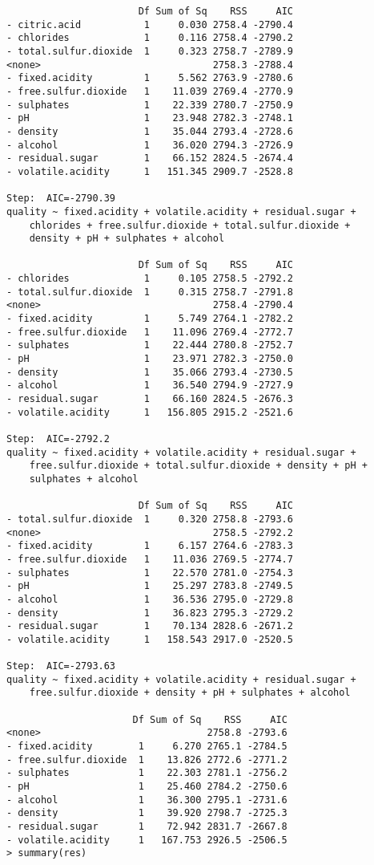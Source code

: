 \documentclass{jsarticle}
\begin{document}
\begin{verbatim}
                       Df Sum of Sq    RSS     AIC
- citric.acid           1     0.030 2758.4 -2790.4
- chlorides             1     0.116 2758.4 -2790.2
- total.sulfur.dioxide  1     0.323 2758.7 -2789.9
<none>                              2758.3 -2788.4
- fixed.acidity         1     5.562 2763.9 -2780.6
- free.sulfur.dioxide   1    11.039 2769.4 -2770.9
- sulphates             1    22.339 2780.7 -2750.9
- pH                    1    23.948 2782.3 -2748.1
- density               1    35.044 2793.4 -2728.6
- alcohol               1    36.020 2794.3 -2726.9
- residual.sugar        1    66.152 2824.5 -2674.4
- volatile.acidity      1   151.345 2909.7 -2528.8

Step:  AIC=-2790.39
quality ~ fixed.acidity + volatile.acidity + residual.sugar + 
    chlorides + free.sulfur.dioxide + total.sulfur.dioxide + 
    density + pH + sulphates + alcohol

                       Df Sum of Sq    RSS     AIC
- chlorides             1     0.105 2758.5 -2792.2
- total.sulfur.dioxide  1     0.315 2758.7 -2791.8
<none>                              2758.4 -2790.4
- fixed.acidity         1     5.749 2764.1 -2782.2
- free.sulfur.dioxide   1    11.096 2769.4 -2772.7
- sulphates             1    22.444 2780.8 -2752.7
- pH                    1    23.971 2782.3 -2750.0
- density               1    35.066 2793.4 -2730.5
- alcohol               1    36.540 2794.9 -2727.9
- residual.sugar        1    66.160 2824.5 -2676.3
- volatile.acidity      1   156.805 2915.2 -2521.6

Step:  AIC=-2792.2
quality ~ fixed.acidity + volatile.acidity + residual.sugar + 
    free.sulfur.dioxide + total.sulfur.dioxide + density + pH + 
    sulphates + alcohol

                       Df Sum of Sq    RSS     AIC
- total.sulfur.dioxide  1     0.320 2758.8 -2793.6
<none>                              2758.5 -2792.2
- fixed.acidity         1     6.157 2764.6 -2783.3
- free.sulfur.dioxide   1    11.036 2769.5 -2774.7
- sulphates             1    22.570 2781.0 -2754.3
- pH                    1    25.297 2783.8 -2749.5
- alcohol               1    36.536 2795.0 -2729.8
- density               1    36.823 2795.3 -2729.2
- residual.sugar        1    70.134 2828.6 -2671.2
- volatile.acidity      1   158.543 2917.0 -2520.5

Step:  AIC=-2793.63
quality ~ fixed.acidity + volatile.acidity + residual.sugar + 
    free.sulfur.dioxide + density + pH + sulphates + alcohol

                      Df Sum of Sq    RSS     AIC
<none>                             2758.8 -2793.6
- fixed.acidity        1     6.270 2765.1 -2784.5
- free.sulfur.dioxide  1    13.826 2772.6 -2771.2
- sulphates            1    22.303 2781.1 -2756.2
- pH                   1    25.460 2784.2 -2750.6
- alcohol              1    36.300 2795.1 -2731.6
- density              1    39.920 2798.7 -2725.3
- residual.sugar       1    72.942 2831.7 -2667.8
- volatile.acidity     1   167.753 2926.5 -2506.5
> summary(res)


\end{verbatim}
\end{document}
